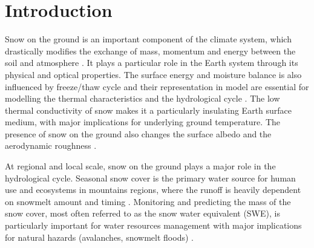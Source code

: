 \documentclass[hydrology,article,submit,moreauthors,pdftex]{Definitions/mdpi}
\begin{document}



\section{Introduction}

Snow on the ground is an important component of the climate system, which drastically modifies the exchange of mass, momentum and energy between the soil and atmosphere \citep{Groisman_1994,Qu_2006,Flanner_2011}. It plays a particular role in the Earth system through its physical and optical properties. The surface energy and moisture balance is also influenced by freeze/thaw cycle and their representation in model are essential for modelling the thermal characteristics and the hydrological cycle \citep{Gouttevin_2012}. The low thermal conductivity of snow makes it a particularly insulating Earth surface medium, with major implications for underlying ground temperature. The presence of snow on the ground also changes the surface albedo and the aerodynamic roughness \citep{Hansen_2004,Flanner_2006,Qu_2014,Hall_2006}. 

At regional and local scale, snow on the ground  plays a major role in the hydrological cycle. Seasonal snow cover is the primary water source for human use and ecosystems in mountains regions, where the runoff is heavily dependent on snowmelt amount and timing \citep{Bales_2006,Bowling_2003}. Monitoring and predicting the mass of the snow cover, most often referred to as the snow water equivalent (SWE), is particularly important for water resources management with major implications for natural hazards (avalanches, snowmelt floods) \citep{Sui_2001,Finger_2012,Viviroli_2011,Freudiger_2014}.
\end{document}
